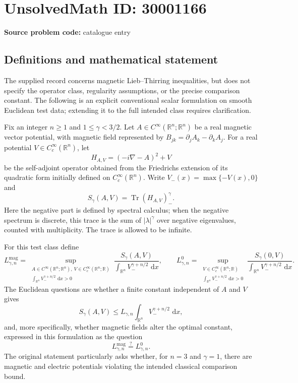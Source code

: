 \documentclass[11pt]{article}
\newcommand{\R}{\mathbb{R}}
\newcommand{\dd}{\,\mathrm{d}}
\begin{document}
\section*{UnsolvedMath ID: 30001166}
\textbf{Source problem code:} catalogue entry
\subsection{Definitions and mathematical statement}
The supplied record concerns magnetic Lieb--Thirring inequalities, but does not specify the operator class, regularity assumptions, or the precise comparison constant. The following is an explicit conventional scalar formulation on smooth Euclidean test data; extending it to the full intended class requires clarification.

Fix an integer \(n\geq 1\) and \(1\leq\gamma<3/2\). Let \(A\in C^\infty(\R^n;\R^n)\) be a real magnetic vector potential, with magnetic field represented by \(B_{jk}=\partial_jA_k-\partial_kA_j\). For a real potential \(V\in C_c^\infty(\R^n)\), let
\[
H_{A,V}=(-i\nabla-A)^2+V
\]
be the self-adjoint operator obtained from the Friedrichs extension of its quadratic form initially defined on \(C_c^\infty(\R^n)\). Write \(V_-(x)=\max\{-V(x),0\}\) and
\[
S_\gamma(A,V)=\operatorname{Tr}(H_{A,V})_-^\gamma.
\]
Here the negative part is defined by spectral calculus; when the negative spectrum is discrete, this trace is the sum of \(|\lambda|^\gamma\) over negative eigenvalues, counted with multiplicity. The trace is allowed to be infinite.

For this test class define
\[
L_{\gamma,n}^{\mathrm{mag}}
=\sup_{\substack{A\in C^\infty(\R^n;\R^n),\ V\in C_c^\infty(\R^n;\R)\\ \int_{\R^n}V_-^{\gamma+n/2}\,\dd x>0}}
\frac{S_\gamma(A,V)}{\int_{\R^n}V_-^{\gamma+n/2}\,\dd x},
\qquad
L_{\gamma,n}^{0}
=\sup_{\substack{V\in C_c^\infty(\R^n;\R)\\ \int_{\R^n}V_-^{\gamma+n/2}\,\dd x>0}}
\frac{S_\gamma(0,V)}{\int_{\R^n}V_-^{\gamma+n/2}\,\dd x}.
\]
The Euclidean questions are whether a finite constant independent of \(A\) and \(V\) gives
\[
S_\gamma(A,V)\leq L_{\gamma,n}\int_{\R^n}V_-^{\gamma+n/2}\,\dd x,
\]
and, more specifically, whether magnetic fields alter the optimal constant, expressed in this formulation as the question
\[
L_{\gamma,n}^{\mathrm{mag}}\stackrel{?}{=}L_{\gamma,n}^{0}.
\]
The original statement particularly asks whether, for \(n=3\) and \(\gamma=1\), there are magnetic and electric potentials violating the intended classical comparison bound.
\end{document}
